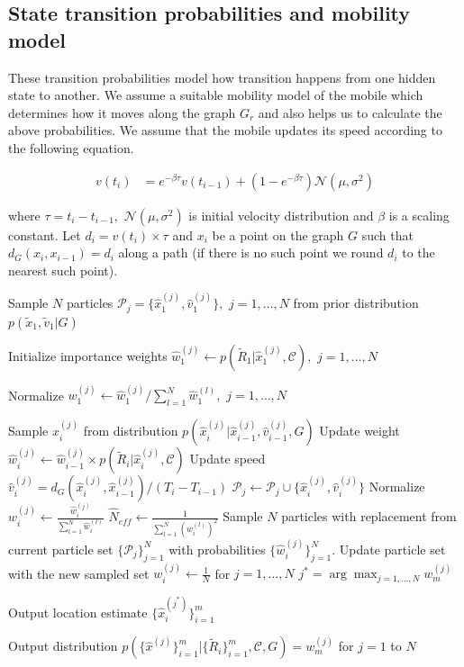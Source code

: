 \documentclass[conference, 10pt]{IEEEtran}
\begin{document}
\subsection{State transition probabilities and mobility model} These transition
probabilities model how transition happens from one hidden state
to another. 
We assume a suitable mobility model of the mobile which determines how it moves
along the graph $G_r$ and also helps us to calculate the above probabilities. We
assume that the mobile updates its speed according to the following equation.

\begin{align}
v(t_i) & = e^{-\beta \tau} v(t_{i-1}) + (1-e^{-\beta \tau}) \mathcal{N}(\mu,\sigma^2)
\label{eqn:tranVel}
\end{align}

where $\tau = t_i-t_{i-1},$ $\mathcal{N}(\mu,\sigma^2)$ is initial velocity
distribution and $\beta$ is a scaling constant. Let $d_i =
v(t_{i}) \times \tau$ and $x_{i}$ be a point on the graph $G$ such that
$d_G(x_i,x_{i-1}) = d_i$ along a path (if there is no such point we round $d_i$
to the nearest such point). 

\begin{algorithm}
\caption{$LocalizeUEpf(\mathcal{D}_{tr},\mathcal{C},G,N_{th})$}
\label{alg:LocalizeUEpf}
\begin{algorithmic}[1]

\State Sample $N$ particles $\mathcal{P}_j = \{\hat{x}_1^{(j)},\hat{v}_1^{(j)}\},$ $j=1,\hdots , N$ 
from prior distribution $p(\tilde{x}_1, \tilde{v}_1|G)$ 

\State Initialize importance weights $\hat{w}_1^{(j)} \gets p(\tilde{R}_1|\hat{x}_1^{(j)}, \mathcal{C}),$ $j=1,\hdots , N$

\State Normalize $w_1^{(j)} \gets \hat{w}_1^{(j)}/\sum_{l=1}^N \hat{w}_1^{(l)},$ $j=1,\hdots , N$

		\State Sample $\hat{x}_i^{(j)}$ from distribution $p(\hat{x}_i^{(j)}|\hat{x}_{i-1}^{(j)},\hat{v}_{i-1}^{(j)},G)$
		\State Update weight $\hat{w}_i^{(j)} \gets \hat{w}_{i-1}^{(j)} \times p(\tilde{R}_i|\hat{x}_{i}^{(j)},\mathcal{C})$ 
		\State Update speed $\hat{v}_i^{(j)} = d_G(\hat{x}_i^{(j)},\hat{x}_{i-1}^{(j)})/(T_i - T_{i-1})$
		\State $\mathcal{P}_j \gets \mathcal{P}_j \cup \{\hat{x}_i^{(j)},\hat{v}_i^{(j)}\}$
	\EndFor
	\State Normalize $w_i^{(j)} \gets \frac{\hat{w}_i^{(j)}}{\sum_{l=1}^N \hat{w}_i^{(l)}}$
	\State $\hat{N}_{eff} \gets \frac{1}{\sum_{l=1}^N (w_{i}^{(l)})^2}$
		\State Sample $N$ particles with replacement from current particle set $\{\mathcal{P}_j\}_{j=1}^N$ with probabilities $\{\hat{w}_i^{(j)}\}_{j=1}^N.$ Update particle set with the new sampled set
		\State $w_i^{(j)} \gets \frac{1}{N}$ for $j=1,\hdots , N$
	\EndIf
\EndFor
\State $j^* = \arg \max_{j = 1 , \hdots, N} w_m^{(j)}$

\State Output location estimate $\{\hat{x}_i^{(j^*)}\}_{i=1}^m$ 

\State Output distribution $p(\{\hat{x}^{(j)}\}_{i=1}^m|\{\tilde{R}_i\}_{i=1}^m,\mathcal{C},G) = w_m^{(j)}$ for $j=1$ to $N$
\end{algorithmic}
\end{algorithm}  
\end{document}
